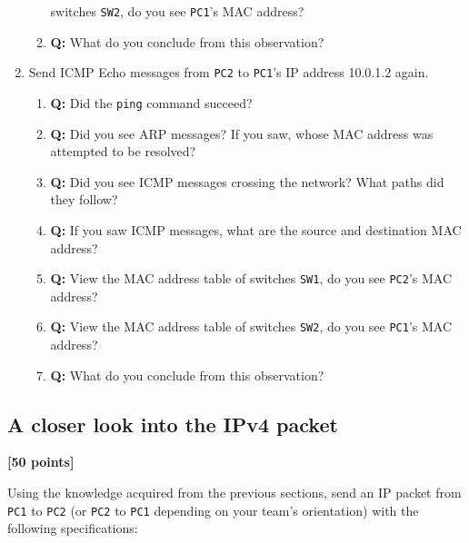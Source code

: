 \documentclass[pdftex,12pt,a4paper]{article}
\begin{document}
\begin{enumerate}
\begin{enumerate}
                            switches \texttt{SW2}, do you see \texttt{PC1}'s MAC address?
                        \item \textbf{Q:} What do you conclude from this observation?
                    \end{enumerate}
                \item Send ICMP Echo messages from \texttt{PC2} to \texttt{PC1}'s IP address
                    10.0.1.2 again.
                    \begin{enumerate}
                        \item \textbf{Q:} Did the \texttt{ping} command succeed?
                        \item \textbf{Q:} Did you see ARP messages? If you saw, whose
                            MAC address was attempted to be resolved?
                        \item \textbf{Q:} Did you see ICMP messages crossing the
                            network? What paths did they follow?
                        \item \textbf{Q:} If you saw ICMP messages, what are
                            the source and destination MAC address?
                        \item \textbf{Q:} View the MAC address table of
                            switches \texttt{SW1}, do you see \texttt{PC2}'s MAC address?
                        \item \textbf{Q:} View the MAC address table of
                            switches \texttt{SW2}, do you see \texttt{PC1}'s MAC address?
                        \item \textbf{Q:} What do you conclude from this observation?
                    \end{enumerate}
            \end{enumerate}


            \subsection{A closer look into the IPv4
            packet}\label{sec:ipv4close}
            \begin{flushright}
                \textbf{[50 points]}
            \end{flushright}

            Using the knowledge acquired from the previous sections, send an IP
            packet from \texttt{PC1} to \texttt{PC2} (or \texttt{PC2} to
            \texttt{PC1} depending on your team's orientation) with the
            following specifications:
\end{document}
